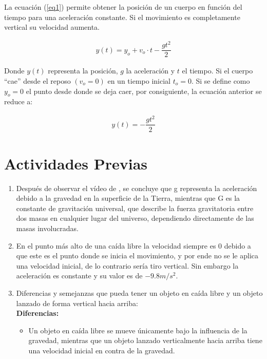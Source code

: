 \begin{multicols}{2}
La ecuación (\ref{eq1}) permite obtener la posición de un cuerpo en función del tiempo para una aceleración constante. Si el movimiento es completamente vertical su velocidad aumenta.

\begin{align}\label{eq1}
    y(t) = y_o + v_o \cdot t  - \dfrac{g t^2}{2}
\end{align}

Donde $y(t)$ representa la posición, $g$ la aceleración y $t$ el tiempo. Si el cuerpo “cae” desde el reposo $(v_o = 0)$ en un tiempo inicial $t_o = 0$. Si se define como $y_o = 0$ el punto desde donde se deja caer, por consiguiente, la ecuación anterior se reduce a:

\begin{align} \label{eq2}
    y(t) = - \dfrac{g t^2}{2}
\end{align}

\section*{Actividades Previas}   
\begin{enumerate}
\item Después de observar el vídeo de \parencite{valdes2024}, se concluye que g representa la aceleración debido a la gravedad en la superficie de la Tierra, mientras que G es la constante de gravitación universal, que describe la fuerza gravitatoria entre dos masas en cualquier lugar del universo, dependiendo directamente de las masas involucradas.

\item  En el punto más alto de una caída libre la velocidad siempre es 0 debido a que este es el punto donde se inicia el movimiento, y por ende no se le aplica una velocidad inicial, de lo contrario sería tiro vertical. 
        Sin embargo la aceleración es constante y su valor es de $-9.8 m/s^2$.
\item Diferencias y semejanzas que pueda tener un objeto en caída libre y un objeto lanzado de forma vertical hacia arriba:\\
    \textbf{Diferencias:}
    \begin{itemize}
        \item Un objeto en caída libre se mueve únicamente bajo la influencia de la gravedad, mientras que un objeto lanzado verticalmente hacia arriba tiene una velocidad inicial en contra de la gravedad.
    \end{itemize}


\end{enumerate}
\end{multicols}
